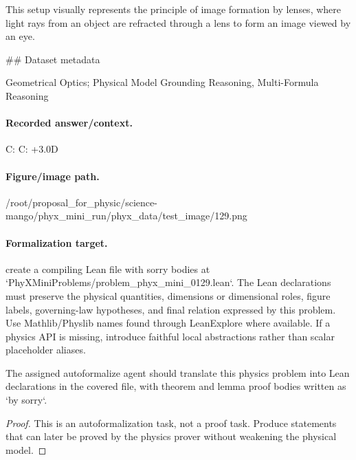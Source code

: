 This setup visually represents the principle of image formation by lenses, where light rays from an object are refracted through a lens to form an image viewed by an eye.

\#\# Dataset metadata

Geometrical Optics; Physical Model Grounding Reasoning, Multi-Formula Reasoning

\paragraph{Recorded answer/context.}
C: C: +3.0D

\paragraph{Figure/image path.}
/root/proposal\_for\_physic/science-mango/phyx\_mini\_run/phyx\_data/test\_image/129.png

\paragraph{Formalization target.}
create a compiling Lean file with sorry bodies at `PhyXMiniProblems/problem\_phyx\_mini\_0129.lean`. The Lean declarations must preserve the physical quantities, dimensions or dimensional roles, figure labels, governing-law hypotheses, and final relation expressed by this problem.
Use Mathlib/Physlib names found through LeanExplore where available. If a physics API is missing, introduce faithful local abstractions rather than scalar placeholder aliases.

\begin{theorem}
\label{thm:physics:phyx_mini_0129:target}
The assigned autoformalize agent should translate this physics problem into Lean declarations in the covered file, with theorem and lemma proof bodies written as `by sorry`.
\end{theorem}
\begin{proof}
This is an autoformalization task, not a proof task. Produce statements that can later be proved by the physics prover without weakening the physical model.
\end{proof}

